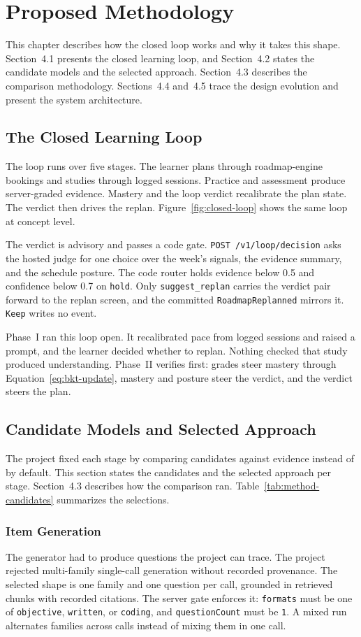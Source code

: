\chapter{Proposed Methodology}
This chapter describes how the closed loop works and why it takes this shape. Section~4.1 presents the closed learning loop, and Section~4.2 states the candidate models and the selected approach. Section~4.3 describes the comparison methodology. Sections~4.4 and~4.5 trace the design evolution and present the system architecture.

\section{The Closed Learning Loop}
The loop runs over five stages. The learner plans through roadmap-engine bookings and studies through logged sessions. Practice and assessment produce server-graded evidence. Mastery and the loop verdict recalibrate the plan state. The verdict then drives the replan. Figure~\ref{fig:closed-loop} shows the same loop at concept level.

The verdict is advisory and passes a code gate. \texttt{POST /v1/loop/decision} asks the hosted judge for one choice over the week's signals, the evidence summary, and the schedule posture. The code router holds evidence below 0.5 and confidence below 0.7 on \texttt{hold}. Only \texttt{suggest\_replan} carries the verdict pair forward to the replan screen, and the committed \texttt{RoadmapReplanned} mirrors it. \texttt{Keep} writes no event.

Phase~I ran this loop open. It recalibrated pace from logged sessions and raised a prompt, and the learner decided whether to replan. Nothing checked that study produced understanding. Phase~II verifies first: grades steer mastery through Equation~\ref{eq:bkt-update}, mastery and posture steer the verdict, and the verdict steers the plan.

\section{Candidate Models and Selected Approach}
The project fixed each stage by comparing candidates against evidence instead of by default. This section states the candidates and the selected approach per stage. Section~4.3 describes how the comparison ran. Table~\ref{tab:method-candidates} summarizes the selections.

\subsection{Item Generation}
The generator had to produce questions the project can trace. The project rejected multi-family single-call generation without recorded provenance. The selected shape is one family and one question per call, grounded in retrieved chunks with recorded citations. The server gate enforces it: \texttt{formats} must be one of \texttt{objective}, \texttt{written}, or \texttt{coding}, and \texttt{questionCount} must be \texttt{1}. A mixed run alternates families across calls instead of mixing them in one call.

